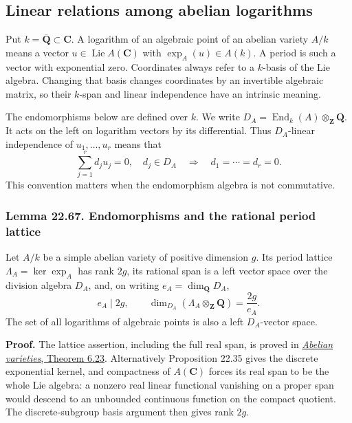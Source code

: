 \documentclass[
  11pt,
  a4paper,
]{article}
\begin{document}
\subsection{Linear relations among abelian
logarithms}\label{linear-relations-among-abelian-logarithms}

Put \(k=\overline{\mathbf Q}\subset\mathbf C\). A logarithm of an
algebraic point of an abelian variety \(A/k\) means a vector
\(u\in\operatorname{Lie}A(\mathbf C)\) with \(\exp_A(u)\in A(k)\). A
period is such a vector with exponential zero. Coordinates always refer
to a \(k\)-basis of the Lie algebra. Changing that basis changes
coordinates by an invertible algebraic matrix, so their \(k\)-span and
linear independence have an intrinsic meaning.

The endomorphisms below are defined over \(k\). We write
\(D_A=\operatorname{End}_k(A)\otimes_{\mathbf Z}\mathbf Q\). It acts on
the left on logarithm vectors by its differential. Thus \(D_A\)-linear
independence of \(u_1,\ldots,u_r\) means that \[
 \sum_{j=1}^r d_j u_j=0,\quad d_j\in D_A
       \quad\Longrightarrow\quad d_1=\cdots=d_r=0.
 \tag{22.169}
\] This convention matters when the endomorphism algebra is not
commutative.

\subsubsection{Lemma 22.67. Endomorphisms and the rational period
lattice}\label{lemma-22.67.-endomorphisms-and-the-rational-period-lattice}

Let \(A/k\) be a simple abelian variety of positive dimension \(g\). Its
period lattice \(\Lambda_A=\ker\exp_A\) has rank \(2g\), its rational
span is a left vector space over the division algebra \(D_A\), and, on
writing \(e_A=\dim_{\mathbf Q}D_A\), \[
 e_A\mid 2g,\qquad
 \dim_{D_A}(\Lambda_A\otimes_{\mathbf Z}\mathbf Q)=\frac{2g}{e_A}.
 \tag{22.170}
\] The set of all logarithms of algebraic points is also a left
\(D_A\)-vector space.

\textbf{Proof.} The lattice assertion, including the full real span, is
proved in
\href{https://github.com/KokunoYumeto/open-math-courses-public/blob/146dc81802e69cf262fb6cc65c1b9f74e71f4625/docs/courses/AG-GS/src/abelian-varieties.md\#complex-uniformization-and-lattices}{\emph{Abelian
varieties}, Theorem 6.23}. Alternatively Proposition 22.35 gives the
discrete exponential kernel, and compactness of \(A(\mathbf C)\) forces
its real span to be the whole Lie algebra: a nonzero real linear
functional vanishing on a proper span would descend to an unbounded
continuous function on the compact quotient. The discrete-subgroup basis
argument then gives rank \(2g\).
\end{document}
